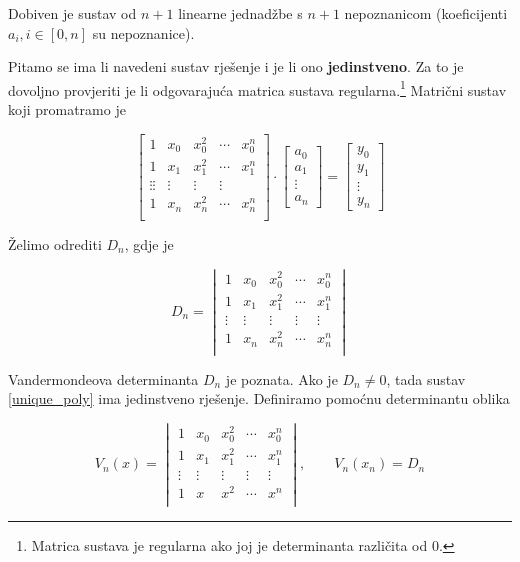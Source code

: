 Dobiven je sustav od $n+1$ linearne jednadžbe s $n+1$ nepoznanicom (koeficijenti $a_i, i\in[0,n]$ su nepoznanice).

Pitamo se ima li navedeni sustav rješenje i je li ono \textbf{jedinstveno}.
Za to je dovoljno provjeriti je li odgovarajuća matrica sustava regularna.\footnote{Matrica sustava je regularna ako joj je determinanta različita od 0.}
Matrični sustav koji promatramo je

\begin{equation}
    \label{unique_poly}
    \begin{bmatrix}
        1&x_0&x_0^2&\cdots&x_0^n\\
        1&x_1&x_1^2&\cdots&x_1^n\\
        \vdots\vdots&\vdots&\vdots&\vdots\\
        1&x_n&x_n^2&\cdots&x_n^n\\
    \end{bmatrix}
    \cdot
    \begin{bmatrix}
        a_0\\
        a_1\\
        \vdots\\
        a_n
    \end{bmatrix}
    =
    \begin{bmatrix}
        y_0\\
        y_1\\
        \vdots\\
        y_n
    \end{bmatrix}
\end{equation}

Želimo odrediti $D_n$, gdje je

$$
D_n = \begin{vmatrix}
    1&x_0&x_0^2&\cdots&x_0^n\\
    1&x_1&x_1^2&\cdots&x_1^n\\
    \vdots&\vdots&\vdots&\vdots&\vdots\\
    1&x_n&x_n^2&\cdots&x_n^n\\
\end{vmatrix}
$$

\newpage

Vandermondeova determinanta $D_n$ je poznata.
Ako je $D_n \neq 0$, tada sustav \ref{unique_poly} ima jedinstveno rješenje.
Definiramo pomoćnu determinantu oblika

$$
V_n(x) = \begin{vmatrix}
    1&x_0&x_0^2&\cdots&x_0^n\\
    1&x_1&x_1^2&\cdots&x_1^n\\
    \vdots&\vdots&\vdots&\vdots&\vdots\\
    1&x&x^2&\cdots&x^n\\
\end{vmatrix},
\qquad V_n(x_n) = D_n
$$

